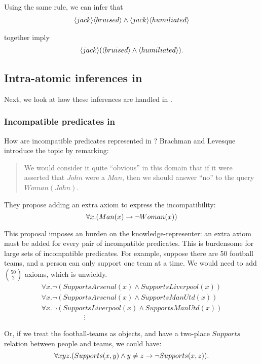\NI Using the same rule, we can infer that
\begin{eqnarray*}
   \langle jack \rangle \langle bruised \rangle \land \langle jack \rangle \langle humiliated \rangle \end{eqnarray*}

\NI together imply
\begin{eqnarray*}
\langle jack \rangle (\langle bruised \rangle \land \langle humiliated \rangle ).
\end{eqnarray*}
 
\subsection{Intra-atomic inferences in \fol{}}
Next, we look at how these inferences are handled in \fol{}.

\subsubsection{Incompatible predicates in \fol{}}\label{incompatiblepredicatesinfol}

\NI How are incompatible predicates represented in \fol{}?  Brachman
and Levesque \cite{brachman} introduce the topic by remarking:
\begin{quote}
   We would consider it quite ``obvious'' in this domain that if it
   were asserted that $John$ were a $Man$, then we should answer
   ``no'' to the query $Woman(John)$.
\end{quote}

\NI They propose adding an extra axiom to express the incompatibility:
\[
   \forall x. ( Man(x) \rightarrow \neg Woman(x) )
\]  
 
\NI This proposal imposes an burden on the knowledge-representer: an
extra axiom must be added for every pair of incompatible predicates.
This is burdensome for large sets of incompatible predicates.  For
example, suppose there are 50 football teams, and a person can only
support one team at a time.  We would need to add ${50 \choose
  2}$ axioms, which is unwieldy.
\[
\begin{array}{l}
  \forall x.  \neg (SupportsArsenal(x) \land SupportsLiverpool(x))  \\
  \forall x.  \neg (SupportsArsenal(x) \land SupportsManUtd(x))  \\
  \forall x.  \neg (SupportsLiverpool(x) \land SupportsManUtd(x))  \\
  \qquad \qquad \qquad \vdots
\end{array}
\]

\NI Or, if we treat the football-teams as objects, and have a
two-place $Supports$ relation between people and teams, we could have:
\[
   \forall x y z . (Supports(x,y) \land y \neq z \rightarrow \neg Supports(x,z)).
\]   

